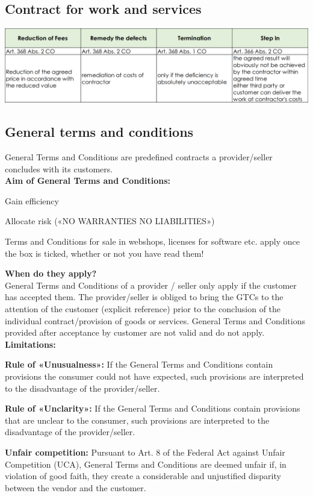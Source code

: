 \subsection{Contract for work and services}
\includegraphics[width=1\linewidth]{images/contractforwork}

\subsection{General terms and conditions}
General Terms and Conditions are predefined contracts a provider/seller concludes with its customers. \\
\textbf{Aim of General Terms and Conditions:}
\begin{compactitem}
	\item Gain efficiency
	\item Allocate risk («NO WARRANTIES NO LIABILITIES»)
	\item Terms and Conditions for sale in webshops, licenses for software etc. apply once the box is ticked, whether or not you have read them!
\end{compactitem}
\textbf{When do they apply?}\\
General Terms and Conditions of a provider / seller only apply if the customer has accepted them. The provider/seller is obliged to bring the GTCs to the attention of the customer (explicit reference) prior to the conclusion of the individual contract/provision of goods or services. General Terms and Conditions provided after acceptance by customer are not valid and do not apply.\\
\textbf{Limitations:}
\begin{compactitem}
	\item \textbf{Rule of «Unusualness»:} If the General Terms and Conditions contain provisions the consumer could	not have expected, such provisions are interpreted to the disadvantage of the provider/seller.
	\item \textbf{Rule of «Unclarity»:}	If the General Terms and Conditions contain provisions that are unclear to the consumer, such provisions are interpreted to the disadvantage of the provider/seller.
	\item \textbf{Unfair competition:} Pursuant to Art. 8 of the Federal Act against Unfair Competition (UCA), General Terms and Conditions are deemed unfair if, in violation of good faith, they create a considerable and unjustified disparity between the vendor and the customer.
\end{compactitem}


